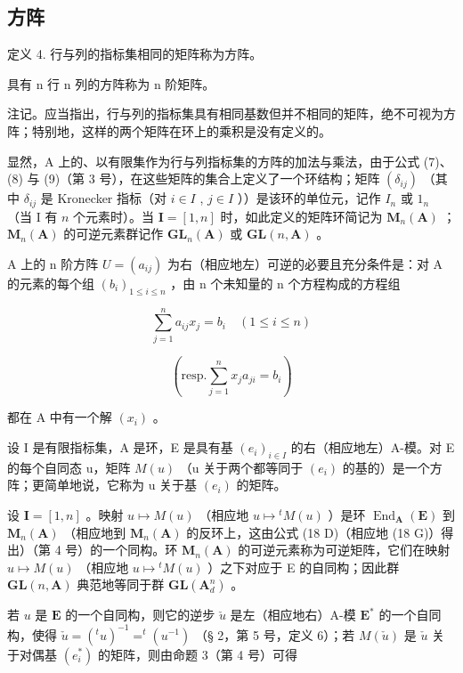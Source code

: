 \subsection{方阵}

定义 4. 行与列的指标集相同的矩阵称为方阵。

具有 n 行 n 列的方阵称为 n 阶矩阵。

注记。应当指出，行与列的指标集具有相同基数但并不相同的矩阵，绝不可视为方阵；特别地，这样的两个矩阵在环上的乘积是没有定义的。

显然，A 上的、以有限集作为行与列指标集的方阵的加法与乘法，由于公式 (7)、(8) 与 (9)（第 3 号），在这些矩阵的集合上定义了一个环结构；矩阵 \((\delta_{ij})\) （其中 \(\delta_{ij}\) 是 Kronecker 指标（对 \(i \in I\) , \(j \in I\) ））是该环的单位元，记作 \(I_n\) 或 \(1_n\) （当 I 有 \(n\) 个元素时）。当 \(\mathbf{I} = [1, n]\) 时，如此定义的矩阵环简记为 \(\mathbf{M}_n(\mathbf{A})\) ； \(\mathbf{M}_n(\mathbf{A})\) 的可逆元素群记作 \(\mathbf{GL}_n(\mathbf{A})\) 或 \(\mathbf{GL}(n, \mathbf{A})\) 。

A 上的 n 阶方阵 \(U = (a_{ij})\) 为右（相应地左）可逆的必要且充分条件是：对 A 的元素的每个组 \((b_i)_{1 \leq i \leq n}\) ，由 n 个未知量的 n 个方程构成的方程组

\[
\sum_ {j = 1} ^ {n} a _ {i j} x _ {j} = b _ {i} \quad (1 \leqslant i \leqslant n)
\]

\[
\left(\text {resp.} \sum_ {j = 1} ^ {n} x _ {j} a _ {j i} = b _ {i}\right)
\]

都在 A 中有一个解 \((x_{i})\) 。

设 I 是有限指标集，A 是环，E 是具有基 \((e_{i})_{i\in I}\) 的右（相应地左）A-模。对 E 的每个自同态 u，矩阵 \(M(u)\) （u 关于两个都等同于 \((e_{i})\) 的基的）是一个方阵；更简单地说，它称为 u 关于基 \((e_{i})\) 的矩阵。

设 \(\mathbf{I} = [1, n]\) 。映射 \(u \mapsto M(u)\) （相应地 \(u \mapsto {}^t M(u)\) ）是环 \(\operatorname{End}_{\mathbf{A}}(\mathbf{E})\) 到 \(\mathbf{M}_n(\mathbf{A})\) （相应地到 \(\mathbf{M}_n(\mathbf{A})\) 的反环上，这由公式 (18 D)（相应地 (18 G)）得出）（第 4 号）的一个同构。环 \(\mathbf{M}_{n}(\mathbf{A})\) 的可逆元素称为可逆矩阵，它们在映射 \(u \mapsto M(u)\) （相应地 \(u \mapsto {}^{t}M(u)\) ）之下对应于 E 的自同构；因此群 \(\mathbf{GL}(n, \mathbf{A})\) 典范地等同于群 \(\mathbf{GL}(\mathbf{A}_{d}^{n})\) 。

若 \(u\) 是 \(\mathbf{E}\) 的一个自同构，则它的逆步 \(\check{u}\) 是左（相应地右）A-模 \(\mathbf{E}^*\) 的一个自同构，使得 \(\check{u} = (^{t}u)^{-1} = ^{t}(u^{-1})\) （§ 2，第 5 号，定义 6）；若 \(M(\check{u})\) 是 \(\check{u}\) 关于对偶基 \((e_{i}^{*})\) 的矩阵，则由命题 3（第 4 号）可得

